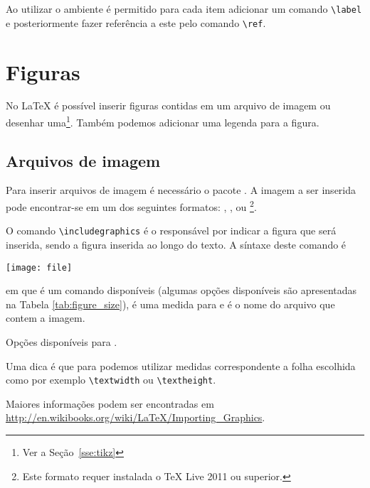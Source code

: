 Ao utilizar o ambiente  \'{e} permitido para cada item adicionar um comando \lstinline!\label! e posteriormente fazer refer\^{e}ncia a este pelo comando \lstinline!\ref!.

\section{Figuras}
No LaTeX é possível inserir figuras contidas em um arquivo de imagem ou desenhar uma\footnote{Ver a Se\c{c}\~{a}o~\ref{sse:tikz}}. Também podemos adicionar uma legenda para a figura.

\subsection{Arquivos de imagem}
Para inserir arquivos de imagem é necessário o pacote . A imagem a ser inserida pode encontrar-se em um dos seguintes formatos: , ,  ou \footnote{Este formato requer instalada o TeX Live 2011 ou superior.}.

O comando \lstinline!\includegraphics! é o responsável por indicar a figura que será inserida, sendo a figura inserida ao longo do texto. A síntaxe deste comando é
\begin{code}
\texttt{[image: file]}
\end{code}
em que  é um comando disponíveis (algumas opções disponíveis são apresentadas na Tabela \ref{tab:figure_size}),  é uma medida para  e  é o nome do arquivo que contem a imagem.
\begin{table}[!htb]
    \centering
    \caption{Opções disponíveis para .}
    \label{tab:figure_size}
    
\end{table}

Uma dica é que para  podemos utilizar medidas correspondente a folha escolhida como por exemplo \lstinline!\textwidth! ou \lstinline!\textheight!.\\

Maiores informações podem ser encontradas em \url{http://en.wikibooks.org/wiki/LaTeX/Importing_Graphics}.

